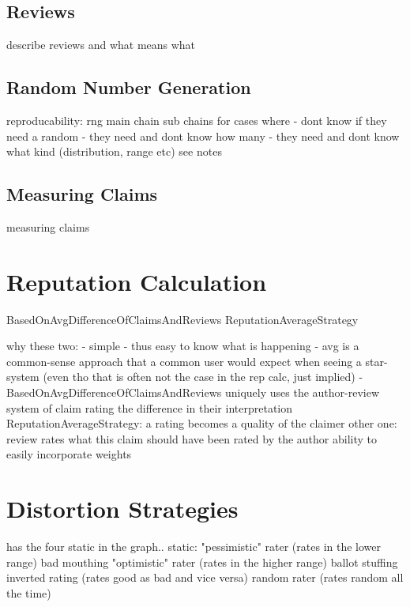 \documentclass[%
    ]{\PathToTumTemplate/thesis/tum_thesis}
\begin{document}
\subsection{Reviews}
describe reviews and what means what

\subsection{Random Number Generation}
reproducability: rng
main chain
sub chains for cases where
- dont know if they need a random
- they need and dont know how many
- they need and dont know what kind (distribution, range etc)
see notes


\subsection{Measuring Claims}\label{sec:approach_measure_claim}
measuring claims

\section{Reputation Calculation}\label{sec:approach_reputation_calculation}
BasedOnAvgDifferenceOfClaimsAndReviews
ReputationAverageStrategy

why these two:
	- simple
	- thus easy to know what is happening
	- avg is a common-sense approach that a common user would expect when seeing a star-system
	(even tho that is often not the case in the rep calc, just implied)
	- BasedOnAvgDifferenceOfClaimsAndReviews uniquely uses the author-review system of claim rating
the difference in their interpretation
	ReputationAverageStrategy: a rating becomes a quality of the claimer
	other one: review rates what this claim should have been rated by the author
ability to easily incorporate weights

\section{Distortion Strategies}\label{sec:distort_strategies}

\cite{yu_detecting_2003} has the four static in the graph..
static:
"pessimistic" rater (rates in the lower range) bad mouthing
"optimistic" rater (rates in the higher range) ballot stuffing
inverted rating (rates good as bad and vice versa)
random rater (rates random all the time)
\end{document}
